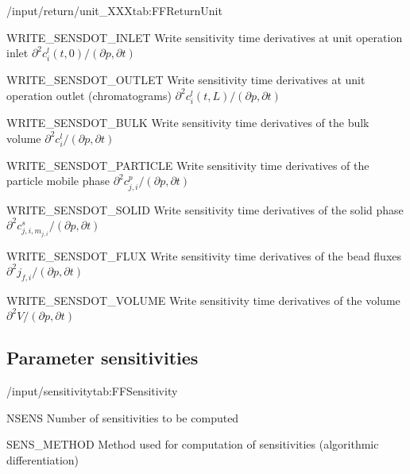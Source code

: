 \begin{groupscope}{/input/return/unit\_XXX}{tab:FFReturnUnit}
\begin{dataset}[type=int, range={$\{0,1\}$}]{WRITE\_SENSDOT\_INLET}
    Write sensitivity time derivatives at unit operation inlet $\partial^2 c^l_i(t,0) / (\partial p, \partial t)$
  \end{dataset}
  \begin{dataset}[type=int, range={$\{0,1\}$}]{WRITE\_SENSDOT\_OUTLET}
    Write sensitivity time derivatives at unit operation outlet (chromatograms) $\partial^2 c^l_i(t,L) / (\partial p, \partial t)$
  \end{dataset}
  \begin{dataset}[type=int, range={$\{0,1\}$}]{WRITE\_SENSDOT\_BULK}
    Write sensitivity time derivatives of the bulk volume $\partial^2 c^l_i / (\partial p, \partial t)$
  \end{dataset}
  \begin{dataset}[type=int, range={$\{0,1\}$}]{WRITE\_SENSDOT\_PARTICLE}
    Write sensitivity time derivatives of the particle mobile phase $\partial^2 c^p_{j,i} / (\partial p, \partial t)$
  \end{dataset}
  \begin{dataset}[type=int, range={$\{0,1\}$}]{WRITE\_SENSDOT\_SOLID}
    Write sensitivity time derivatives of the solid phase $\partial^2 c^s_{j,i,m_{j,i}} / (\partial p, \partial t)$
  \end{dataset}
  \begin{dataset}[type=int, range={$\{0,1\}$}]{WRITE\_SENSDOT\_FLUX}
    Write sensitivity time derivatives of the bead fluxes $\partial^2 j_{f,i} / (\partial p, \partial t)$
  \end{dataset}
  \begin{dataset}[type=int, range={$\{0,1\}$}]{WRITE\_SENSDOT\_VOLUME}
    Write sensitivity time derivatives of the volume $\partial^2 V / (\partial p, \partial t)$
  \end{dataset}
\end{groupscope}

\subsection{Parameter sensitivities}

\begin{groupscope}{/input/sensitivity}{tab:FFSensitivity} 
  \begin{dataset}[type=int, range={$\geq 0$}, length=1]{NSENS}
    Number of sensitivities to be computed
  \end{dataset}     
  \begin{dataset}[type=string, range={\texttt{ad1}}, length=1]{SENS\_METHOD}
    Method used for computation of sensitivities (algorithmic differentiation)
  \end{dataset}    
\end{groupscope}

